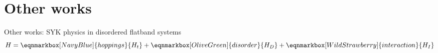 \section{Other works}
\begin{frame}{Other works: SYK physics in disordered flatband systems}
    \begin{equation*}
        H = \eqnmarkbox[NavyBlue]{hoppings}{H_{t}}
        + \eqnmarkbox[OliveGreen]{disorder}{H_{D}}
        + \eqnmarkbox[WildStrawberry]{interaction}{H_{I}}
    \end{equation*}

    \vspace{-6.5mm}
    

\end{frame}
